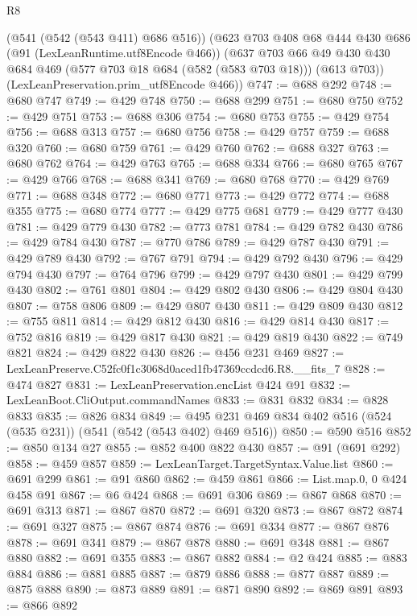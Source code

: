 \begin{lexlean}{R8}
\begin{coremodule}
    (@541 (@542 (@543 @411) @686 @516))
    (@623
      @703
      @408
      @68
      @444
      @430
      @686
      (@91 (LexLeanRuntime.utf8Encode @466))
      (@637
        @703
        @66
        @49
        @430
        @430
        @684
        @469
        (@577 @703 @18 @684 (@582 (@583 @703 @18)))
        (@613 @703))
      (LexLeanPreservation.prim_utf8Encode @466))
@747 := @688 @292
@748 := @680 @747
@749 := @429 @748
@750 := @688 @299
@751 := @680 @750
@752 := @429 @751
@753 := @688 @306
@754 := @680 @753
@755 := @429 @754
@756 := @688 @313
@757 := @680 @756
@758 := @429 @757
@759 := @688 @320
@760 := @680 @759
@761 := @429 @760
@762 := @688 @327
@763 := @680 @762
@764 := @429 @763
@765 := @688 @334
@766 := @680 @765
@767 := @429 @766
@768 := @688 @341
@769 := @680 @768
@770 := @429 @769
@771 := @688 @348
@772 := @680 @771
@773 := @429 @772
@774 := @688 @355
@775 := @680 @774
@777 := @429 @775 @681
@779 := @429 @777 @430
@781 := @429 @779 @430
@782 := @773 @781
@784 := @429 @782 @430
@786 := @429 @784 @430
@787 := @770 @786
@789 := @429 @787 @430
@791 := @429 @789 @430
@792 := @767 @791
@794 := @429 @792 @430
@796 := @429 @794 @430
@797 := @764 @796
@799 := @429 @797 @430
@801 := @429 @799 @430
@802 := @761 @801
@804 := @429 @802 @430
@806 := @429 @804 @430
@807 := @758 @806
@809 := @429 @807 @430
@811 := @429 @809 @430
@812 := @755 @811
@814 := @429 @812 @430
@816 := @429 @814 @430
@817 := @752 @816
@819 := @429 @817 @430
@821 := @429 @819 @430
@822 := @749 @821
@824 := @429 @822 @430
@826 := @456 @231 @469
@827 := LexLeanPreserve.C52fc0f1c3068d0aced1fb47369ccdcd6.R8.__fits_7
@828 := @474 @827
@831 := LexLeanPreservation.encList @424 @91
@832 := LexLeanBoot.CliOutput.commandNames
@833 := @831 @832
@834 := @828 @833
@835 := @826 @834
@849 := @495 @231 @469 @834 @402 @516 (@524 (@535 @231)) (@541 (@542 (@543 @402) @469 @516))
@850 := @590 @516
@852 := @850 @134 @27
@855 := @852 @400 @822 @430
@857 := @91 (@691 @292)
@858 := @459 @857
@859 := LexLeanTarget.TargetSyntax.Value.list
@860 := @691 @299
@861 := @91 @860
@862 := @459 @861
@866 := List.map.{0, 0} @424 @458 @91
@867 := @6 @424
@868 := @691 @306
@869 := @867 @868
@870 := @691 @313
@871 := @867 @870
@872 := @691 @320
@873 := @867 @872
@874 := @691 @327
@875 := @867 @874
@876 := @691 @334
@877 := @867 @876
@878 := @691 @341
@879 := @867 @878
@880 := @691 @348
@881 := @867 @880
@882 := @691 @355
@883 := @867 @882
@884 := @2 @424
@885 := @883 @884
@886 := @881 @885
@887 := @879 @886
@888 := @877 @887
@889 := @875 @888
@890 := @873 @889
@891 := @871 @890
@892 := @869 @891
@893 := @866 @892

\end{coremodule}
\end{lexlean}
